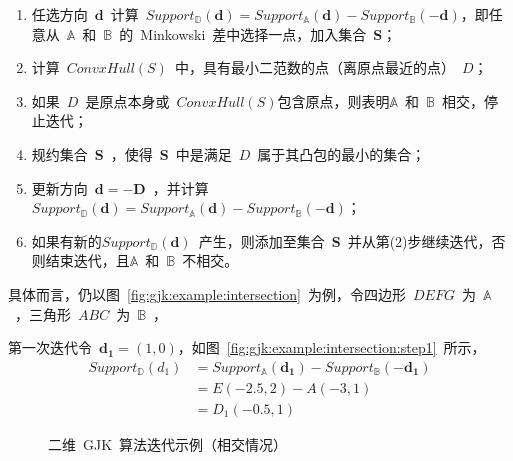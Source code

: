 \begin{enumerate}[(1)]
  \item 任选方向~$\bm{d}$~计算~$Support_\mathbb{D}(\bm{d}) = Support_\mathbb{A}(\bm{d}) - Support_\mathbb{B}(-\bm{d})$，即任意从~$\mathbb{A}$~和~$\mathbb{B}$~的~Minkowski~差中选择一点，加入集合~$\bm{S}$；
  \item 计算~$ConvxHull(S)$~中，具有最小二范数的点（离原点最近的点）~$D$； 
  \item 如果~$D$~是原点本身或~$ConvxHull(S)$包含原点，则表明$\mathbb{A}$~和~$\mathbb{B}$~相交，停止迭代；
  \item 规约集合~$\bm{S}$~，使得~$\bm{S}$~中是满足~$D$~属于其凸包的最小的集合；
  \item 更新方向~$\bm{d} = -\bm{D}$~，并计算~$Support_\mathbb{D}(\bm{d}) = Support_\mathbb{A}(\bm{d}) - Support_\mathbb{B}(-\bm{d})$；
  \item 如果有新的$Support_\mathbb{D}(\bm{d})$~产生，则添加至集合~$\bm{S}$~并从第(2)步继续迭代，否则结束迭代，且$\mathbb{A}$~和~$\mathbb{B}$~不相交。
\end{enumerate}

具体而言，仍以图~\ref{fig:gjk:example:intersection}~为例，令四边形~$DEFG$~为~$\mathbb{A}$~，三角形~$ABC$~为~$\mathbb{B}$~，

第一次迭代令~$\bm{d_1} = (1,0)$，如图~\ref{fig:gjk:example:intersection:step1}~所示，
\begin{equation}
  \begin{array}{ll}
    Support_\mathbb{D}(d_1) & = Support_\mathbb{A}(\bm{d_1}) - Support_\mathbb{B}(-\bm{d_1}) \\
                            & = E(-2.5, 2) - A(-3,1) \\
                            & = D_1(-0.5, 1)
  \end{array}
  \label{euqa:gjk:step1}
\end{equation}

\begin{figure}[htbp]
\centering
{} 
\caption{二维~GJK~算法迭代示例（相交情况）}
\label{fig:gjk:example:2d:intersection:iterator}
\end{figure}

